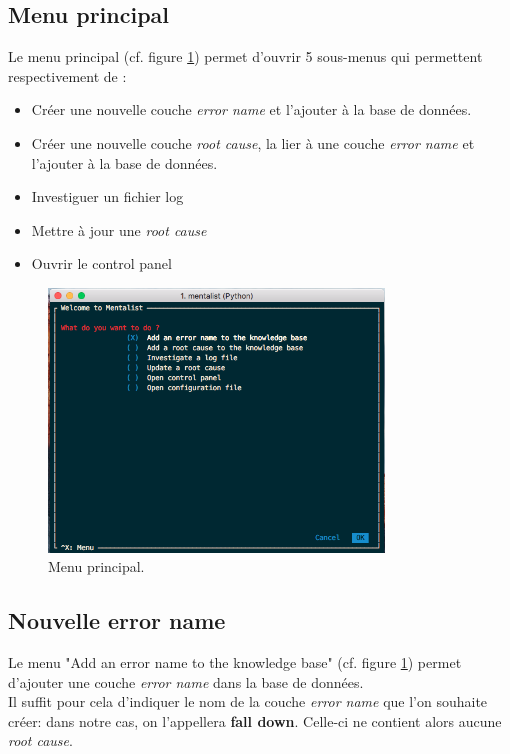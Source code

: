 \subsection{Menu principal}
\label{Industrialisation du produit: Utilisation suggérée des outils: Menu principal}
Le menu principal (cf. figure \ref{fig:Menu principal}) permet d'ouvrir 5 sous-menus qui permettent respectivement de :
\begin{itemize}
	\item Créer une nouvelle couche \emph{error name} et l'ajouter à la base de données.
	\item Créer une nouvelle couche \emph{root cause}, la lier à une couche \emph{error name} et l'ajouter à la base de données.
	\item Investiguer un fichier log
	\item Mettre à jour une \emph{root cause}
	\item Ouvrir le control panel
\end{itemize}

\begin{figure}[H]
	\centering\includegraphics[height=7cm]{images/main_menu.png}
	\caption[Menu principal]{Menu principal.}
	\label{fig:Menu principal}
\end{figure} 

\subsection{Nouvelle error name}
\label{Industrialisation du produit: Utilisation suggérée des outils: Nouvelle error name}
Le menu "Add an error name to the knowledge base" (cf. figure \ref{fig:Menu principal}) permet d'ajouter une couche \emph{error name} dans la base de données. \\
Il suffit pour cela d'indiquer le nom de la couche \emph{error name} que l'on souhaite créer: dans notre cas, on l'appellera \textbf{fall down}. Celle-ci ne contient alors aucune \emph{root cause}.

